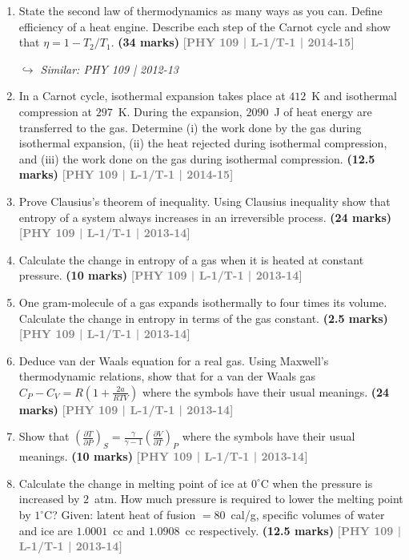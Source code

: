 \documentclass[12pt,a3paper]{article}
\newcommand{\yr}[1]{\hfill\textcolor{gray}{\small\textbf{[#1]}}}
\newcommand{\mk}[1]{\textcolor{orange!70!black}{\small\textbf{(#1 marks)}}}
\newcommand{\variant}[1]{\par\vspace{1pt}\textcolor{blue!50!black}%
  {\footnotesize\textit{$\hookrightarrow$ Similar: #1}}}
\begin{document}
\begin{enumerate}
\item State the second law of thermodynamics as many ways as you can. Define efficiency of a heat engine. Describe each step of the Carnot cycle and show that $\eta = 1 - T_2/T_1$.
\mk{34} \yr{PHY 109 | L-1/T-1 | 2014-15}
\variant{PHY 109 | 2012-13}

\item In a Carnot cycle, isothermal expansion takes place at $412$~K and isothermal compression at $297$~K. During the expansion, $2090$~J of heat energy are transferred to the gas. Determine (i) the work done by the gas during isothermal expansion, (ii) the heat rejected during isothermal compression, and (iii) the work done on the gas during isothermal compression.
\mk{12.5} \yr{PHY 109 | L-1/T-1 | 2014-15}

\item Prove Clausius's theorem of inequality. Using Clausius inequality show that entropy of a system always increases in an irreversible process.
\mk{24} \yr{PHY 109 | L-1/T-1 | 2013-14}

\item Calculate the change in entropy of a gas when it is heated at constant pressure.
\mk{10} \yr{PHY 109 | L-1/T-1 | 2013-14}

\item One gram-molecule of a gas expands isothermally to four times its volume. Calculate the change in entropy in terms of the gas constant.
\mk{2.5} \yr{PHY 109 | L-1/T-1 | 2013-14}

\item Deduce van der Waals equation for a real gas. Using Maxwell's thermodynamic relations, show that for a van der Waals gas $C_P - C_V = R\left(1 + \frac{2a}{RTV}\right)$ where the symbols have their usual meanings.
\mk{24} \yr{PHY 109 | L-1/T-1 | 2013-14}

\item Show that $\left(\frac{\partial T}{\partial P}\right)_S = \frac{\gamma}{\gamma-1}\left(\frac{\partial V}{\partial T}\right)_P$ where the symbols have their usual meanings.
\mk{10} \yr{PHY 109 | L-1/T-1 | 2013-14}

\item Calculate the change in melting point of ice at $0^\circ$C when the pressure is increased by $2$~atm. How much pressure is required to lower the melting point by $1^\circ$C? Given: latent heat of fusion $= 80$~cal/g, specific volumes of water and ice are $1.0001$~cc and $1.0908$~cc respectively.
\mk{12.5} \yr{PHY 109 | L-1/T-1 | 2013-14}


\end{enumerate}
\end{document}
